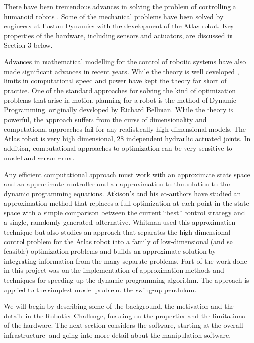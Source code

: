 \documentclass[12pt]{report}
\begin{document}
There have been tremendous advances in solving the problem of controlling a humanoid robots \cite{eric_thesis}. Some of the mechanical problems have been solved by engineers at Boston Dynamics with the development of the Atlas robot. Key properties of the hardware, including sensors and actuators, are discussed in Section 3 below. 

Advances in mathematical modelling for the control of robotic systems have also made significant advances in recent years.  While the theory is well developed \cite{Deterministic_and_Stochastic}, limits in computational speed and power have kept the theory far short of practice.  One of the standard approaches for solving  the kind of optimization problems that arise in motion planning for a robot is the method of Dynamic Programming, originally developed by Richard Bellman. \cite{Deterministic_and_Stochastic} While the theory is powerful, the approach suffers from the curse of dimensionality \cite{random_sampling_dynamic_programming} and computational approaches fail for any realistically high-dimensional models.  The Atlas robot is very high dimensional, 28 independent hydraulic actuated joints. In addition, computational approaches to optimization can be very sensitive to model and sensor error. 

Any efficient computational approach must work with an approximate state space and an approximate controller and an approximation to the solution to the dynamic programming equations.  Atkison's \cite{random_sampling_dynamic_programming} and his co-authors have studied an approximation method that replaces a full optimization at each point in the state space with a simple comparison between the current “best” control strategy and a single, ramdomly generated, alternative.  Whitman \cite{eric_thesis} used this approximation technique but also studies an approach that separates the high-dimensional control problem for the Atlas robot into a family of low-dimensional (and so feasible) optimization problems and builds an approximate solution by integrating information from the many separate problems.  
Part of the work done in this project was on the implementation of approximation methods and techniques for speeding up the dynamic programming algorithm.  The approach is applied to the simplest model problem: the swing-up pendulum. \cite{eric_thesis} 

We will begin by describing some of the background, the motivation and the details in the Robotics Challenge, focusing on the properties and the limitations of the hardware.  The next section considers the software, starting at the overall infrastructure, and going into more detail about the manipulation software. 
\end{document}
